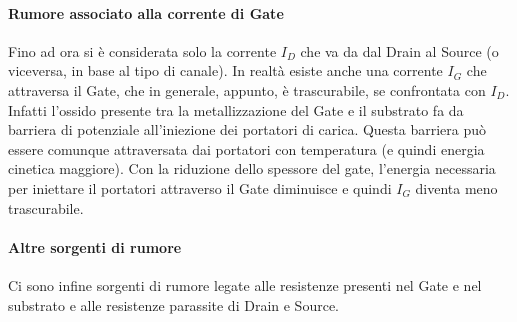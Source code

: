 \paragraph*{Rumore associato alla corrente di Gate}
Fino ad ora si è considerata solo la corrente $I_D$ che va da dal Drain al Source (o viceversa, in base al tipo di canale). In realtà esiste anche una corrente $I_G$ che attraversa il Gate, che in generale, appunto, è trascurabile, se confrontata con  $I_D$. Infatti l'ossido presente tra la metallizzazione del Gate e il substrato fa da barriera di potenziale all'iniezione dei portatori di carica. Questa barriera può essere comunque attraversata dai portatori con temperatura (e quindi energia cinetica maggiore). Con la riduzione dello spessore del gate, l'energia necessaria per iniettare il portatori attraverso il Gate diminuisce e quindi $I_G$ diventa meno trascurabile.

\paragraph*{Altre sorgenti di rumore}
Ci sono infine sorgenti di rumore legate alle resistenze presenti nel Gate e nel substrato e alle resistenze parassite di Drain e Source.